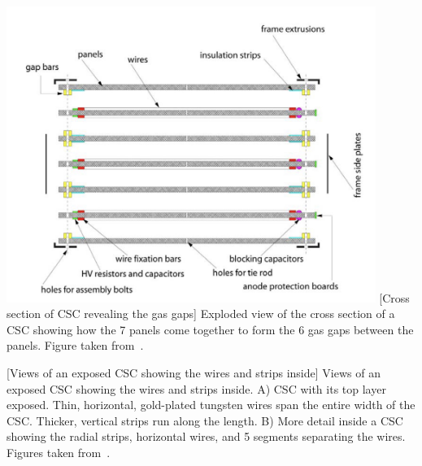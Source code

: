 \begin{multiFigure}
    \centering
        \includegraphics[width=0.9\textwidth,keepaspectratio]{figures/cms/muonsys/csc_separatedlayers.jpeg}
        [Cross section of CSC revealing the gas gaps]
        {Exploded view of the cross section of a CSC showing how the 7 panels come together to form the 6 gas gaps between the panels.
        Figure taken from~\cite{collaboration_cms_2008}.}
    \label{fig:csc_separatelayers}
\end{multiFigure}
\begin{multiFigure}
    \centering
        [Views of an exposed CSC showing the wires and strips inside]
        {Views of an exposed CSC showing the wires and strips inside.
        \;A) CSC with its top layer exposed.
        Thin, horizontal, gold-plated tungsten wires span the entire width of the CSC. 
        Thicker, vertical strips run along the length.
        \;B) More detail inside a CSC showing the radial strips, horizontal wires, and 5 segments separating the wires.
        Figures taken from~\cite{collaboration_cms_2008}.}
    \label{fig:csc_guts}
\end{multiFigure}

